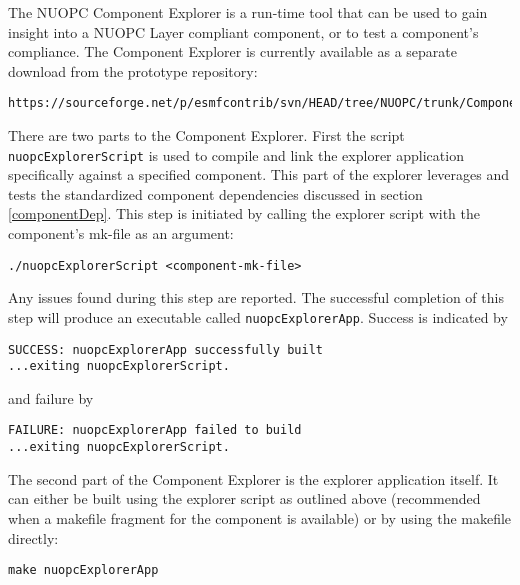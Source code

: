 %

\label{Explorer}

The NUOPC Component Explorer is a run-time tool that can be used to gain insight into a NUOPC Layer compliant component, or to test a component's compliance. The Component Explorer is currently available as a separate download from the prototype repository:

\begin{verbatim}
https://sourceforge.net/p/esmfcontrib/svn/HEAD/tree/NUOPC/trunk/ComponentExplorer/
\end{verbatim}

There are two parts to the Component Explorer. First the script {\tt nuopcExplorerScript} is used to compile and link the explorer application specifically against a specified component. This part of the explorer leverages and tests the standardized component dependencies discussed in section \ref{componentDep}. This step is initiated by calling the explorer script with the component's mk-file as an argument:

\begin{verbatim}
./nuopcExplorerScript <component-mk-file>
\end{verbatim}

Any issues found during this step are reported. The successful completion of this step will produce an executable called {\tt nuopcExplorerApp}. Success is indicated by 

\begin{verbatim}
SUCCESS: nuopcExplorerApp successfully built
...exiting nuopcExplorerScript.
\end{verbatim}

and failure by

\begin{verbatim}
FAILURE: nuopcExplorerApp failed to build
...exiting nuopcExplorerScript.
\end{verbatim}

The second part of the Component Explorer is the explorer application itself. It can either be built using the explorer script as outlined above (recommended when a makefile fragment for the component is available) or by using the makefile directly:

\begin{verbatim}
make nuopcExplorerApp
\end{verbatim}

